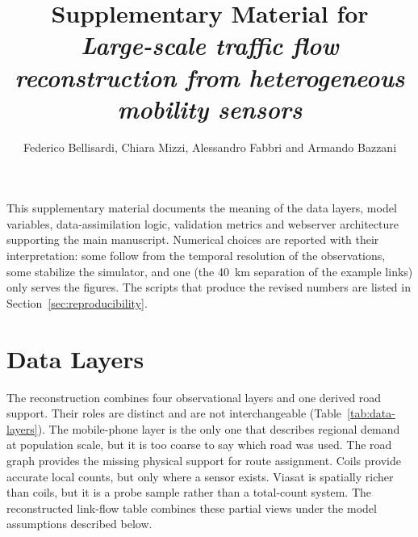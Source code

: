 \documentclass[11pt,a4paper]{article}
\title{Supplementary Material for\\
\emph{Large-scale traffic flow reconstruction from heterogeneous mobility sensors}}
\author{Federico Bellisardi, Chiara Mizzi, Alessandro Fabbri and Armando Bazzani}
\date{}
\begin{document}
\maketitle

\noindent This supplementary material documents the meaning of the data
layers, model variables, data-assimilation logic, validation metrics and webserver architecture supporting the main manuscript. Numerical choices are reported with their interpretation: some follow from the temporal resolution of the observations, some stabilize the simulator, and one (the 40~km separation of the example links) only serves the figures. The scripts that produce the revised numbers are listed in Section~\ref{sec:reproducibility}.

\section{Data Layers}
\label{sec:data-layers}

The reconstruction combines four observational layers and one derived road support. Their roles are distinct and are not interchangeable (Table~\ref{tab:data-layers}). The mobile-phone layer is the only one that describes regional demand at population scale, but it is too coarse to say which road was used. The road graph provides the missing physical support for route assignment. Coils provide accurate local counts, but only where a sensor exists. Viasat is spatially richer than coils, but it is a probe sample rather than a total-count system. The reconstructed link-flow table combines these partial views under the model assumptions described below.
\end{document}
